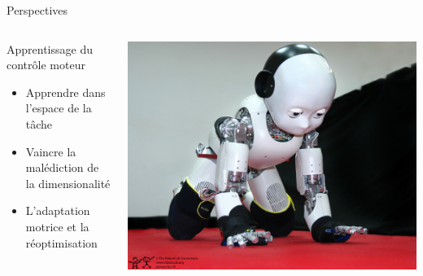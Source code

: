 \begin{frame}{Perspectives}
    \begin{columns}
        \begin{column}{0.50\textwidth}
            Apprentissage du contrôle moteur
            \begin{itemize}
                \item Apprendre dans l'espace de la tâche
                \item Vaincre la \og{}malédiction de la dimensionalité\fg{}
                \item L'adaptation motrice et la réoptimisation
            \end{itemize}
        \end{column}
        \begin{column}{0.50\textwidth}
            \begin{center}
                \includegraphics[width=.95\linewidth]{fig/icub3_light}
            \end{center}
        \end{column}
    \end{columns}
\end{frame}
